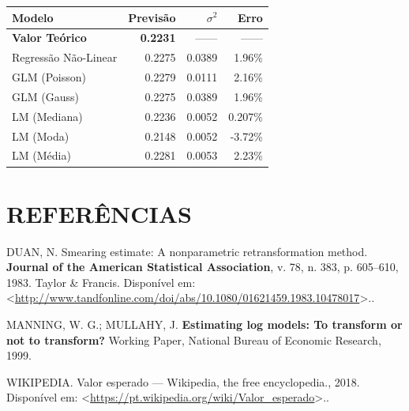 \documentclass[a4paper]{article}
\begin{document}
\begin{longtable}[]{@{}lrrr@{}}
\toprule
Modelo & Previsão & \(\sigma^2\) & Erro\tabularnewline
\midrule
\endhead
\textbf{Valor Teórico} & \textbf{0.2231} & ------ &
------\tabularnewline
Regressão Não-Linear & 0.2275 & 0.0389 & 1.96\%\tabularnewline
GLM (Poisson) & 0.2279 & 0.0111 & 2.16\%\tabularnewline
GLM (Gauss) & 0.2275 & 0.0389 & 1.96\%\tabularnewline
LM (Mediana) & 0.2236 & 0.0052 & 0.207\%\tabularnewline
LM (Moda) & 0.2148 & 0.0052 & -3.72\%\tabularnewline
LM (Média) & 0.2281 & 0.0053 & 2.23\%\tabularnewline
\bottomrule
\end{longtable}

\section*{REFERÊNCIAS}\label{referencias}

\hypertarget{refs}{}
\hypertarget{ref-Duan}{}
DUAN, N. Smearing estimate: A nonparametric retransformation method.
\textbf{Journal of the American Statistical Association}, v. 78, n. 383,
p. 605--610, 1983. Taylor \& Francis. Disponível em:
\textless{}\url{http://www.tandfonline.com/doi/abs/10.1080/01621459.1983.10478017}\textgreater{}..

\hypertarget{ref-NBERt0246}{}
MANNING, W. G.; MULLAHY, J. \textbf{Estimating log models: To transform
or not to transform?} Working Paper, National Bureau of Economic
Research, 1999.

\hypertarget{ref-wiki:E}{}
WIKIPEDIA. Valor esperado --- Wikipedia, the free encyclopedia., 2018.
Disponível em:
\textless{}\url{https://pt.wikipedia.org/wiki/Valor_esperado}\textgreater{}..
\end{document}
